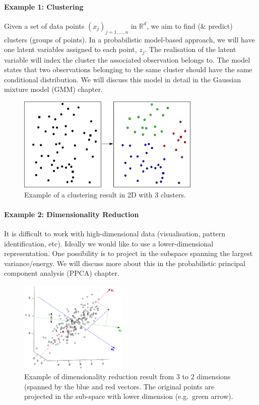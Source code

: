 \paragraph{Example 1: Clustering} Given a set of data points $(x_j)_{j=1,\ldots,n}$ in ${\mathbb R}^d$, we aim to find (\& predict) clusters (groups of points). In a probabilistic model-based approach, we will have one latent variables assigned to each point, $z_j$. The realisation of the latent variable will index the cluster the associated observation belongs to. The model states that two observations belonging to the same cluster should have the same conditional distribution. We will discuss this model in detail in the Gaussian mixture model (GMM) chapter.
\begin{figure}[H]
\centering
\includegraphics[height=4.5cm]{fig/clustering-3.pdf}
\caption{Example of a clustering result in 2D with 3 clusters.}
\end{figure}


\paragraph{Example 2: Dimensionality Reduction} It is difficult to work with high-dimensional data (visualisation, pattern identification, etc). Ideally we would like to use a lower-dimensional representation. One possibility is to project in the subspace spanning the largest variance/energy. We will discuss more about this in the probabilistic principal component analysis (PPCA) chapter.
	
\begin{figure}[H]
\centering
\includegraphics[height=4.4cm]{fig/ppca_cloud_axes.pdf}
\caption{Example of dimensionality reduction result from 3 to 2 dimensions (spanned by the blue and red vectors. The original points are projected in the sub-space with lower dimension (e.g.\ green arrow).}
\end{figure}



